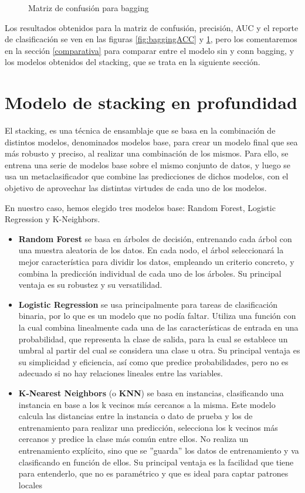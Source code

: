 \documentclass[a4paper,onecolumn]{extarticle}
\let\stdsection\section
\renewcommand\section{\newpage\stdsection}
\begin{document}
\begin{sloppypar}
\begin{figure}[h!]
\begin{minipage}[b]{0.45\textwidth}
        \caption{Matriz de confusión para bagging}
        \label{fig:baggingConf}
    \end{minipage}
\end{figure}

Los resultados obtenidos para la matriz de confusión, precisión, AUC y el reporte de clasificación se ven en las figuras \ref{fig:baggingACC} y 
\ref{fig:baggingConf}, pero los comentaremos en la sección \ref{comparativa} para comparar entre el modelo sin y conn bagging, y los modelos obtenidos del 
stacking, que se trata en la siguiente sección.

\section{Modelo de stacking en profundidad}\label{stacking}
El stacking, es una técnica de ensamblaje que se basa en la combinación de distintos modelos, denominados modelos base, para crear un modelo final que sea más 
robusto y preciso, al realizar una combinación de los mismos. Para ello, se entrena una serie de modelos base sobre el mismo conjunto de datos, y luego se 
usa un metaclasificador que combine las predicciones de dichos modelos, con el objetivo de aprovechar las distintas virtudes de cada uno de los modelos.

En nuestro caso, hemos elegido tres modelos base: Random Forest, Logistic Regression y K-Neighbors.
\begin{itemize}
    \item \textbf{Random Forest} se basa en árboles de decisión, entrenando cada árbol con una muestra aleatoria de los datos. En cada nodo, el árbol seleccionará
    la mejor característica para dividir los datos, empleando un criterio concreto, y combina la predicción individual de cada uno de los árboles. Su principal 
    ventaja es su robustez y su versatilidad.
    \item \textbf{Logistic Regression} se usa principalmente para tareas de clasificación binaria, por lo que es un modelo que no podía faltar. Utiliza una función
    con la cual combina linealmente cada una de las características de entrada en una probabilidad, que representa la clase de salida, para la cual se establece
    un umbral al partir del cual se considera una clase u otra. Su principal ventaja es su simplicidad y eficiencia, así como que predice probabilidades, pero 
    no es adecuado si no hay relaciones lineales entre las variables.
    \item \textbf{K-Nearest Neighbors} (o \textbf{KNN}) se basa en instancias, clasificando una instancia en base a los k vecinos más cercanos a la misma. Este 
    modelo calcula las distancias entre la instancia o dato de prueba y los de entrenamiento para realizar una predicción, selecciona los k vecinos más cercanos 
    y predice la clase más común entre ellos. No realiza un entrenamiento explícito, sino que se ''guarda'' los datos de entrenamiento y va clasificando en función
    de ellos. Su principal ventaja es la facilidad que tiene para entenderlo, que no es paramétrico y que es ideal para captar patrones locales
\end{itemize}


\end{sloppypar}
\end{document}
